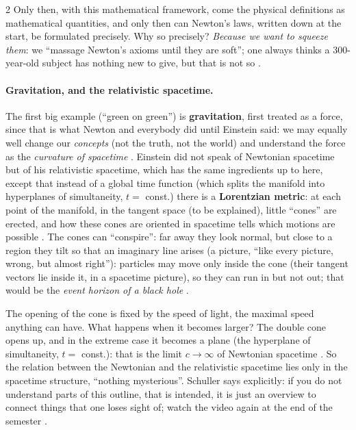 \begin{paracol}{2}
Only then, with this mathematical framework, come the physical definitions as mathematical quantities, and only then can
Newton's laws, written down at the start, be formulated precisely. Why so precisely? \emph{Because we want to squeeze
them}: we ``massage Newton's axioms until they are soft''; one always thinks a 300-year-old subject has nothing new to
give, but that is not so .

\paragraph{Gravitation, and the relativistic spacetime.} The first big example (``green on green'') is
\textbf{gravitation}, first treated as a force, since that is what Newton and everybody did until Einstein said: we may
equally well change our \emph{concepts} (not the truth, not the world) and understand the force as the
\emph{curvature of spacetime} . Einstein did not speak of Newtonian
spacetime but of his relativistic spacetime, which has the same ingredients up to here, except that instead of a global
time function (which splits the manifold into hyperplanes of simultaneity, $t=$ const.) there is a \textbf{Lorentzian
metric}: at each point of the manifold, in the tangent space (to be explained), little ``cones'' are erected, and how
these cones are oriented in spacetime tells which motions are possible .
The cones can ``conspire'': far away they look normal, but close to a region they tilt so that an imaginary line arises
(a picture, ``like every picture, wrong, but almost right''): particles may move only inside the cone (their tangent
vectors lie inside it, in a spacetime picture), so they can run in but not out; that would be the \emph{event horizon of
a black hole} .

The opening of the cone is fixed by the speed of light, the maximal speed anything can have. What happens when
it becomes larger? The double cone opens up, and in the extreme case it becomes a plane (the hyperplane of simultaneity,
$t=$ const.): that is the limit $c\to\infty$ of Newtonian spacetime .
So the relation between the Newtonian and the relativistic spacetime lies only in the spacetime structure, ``nothing
mysterious''. Schuller says explicitly: if you do not understand parts of this outline, that is intended, it is just an
overview to connect things that one loses sight of; watch the video again at the end of the semester
.


\end{paracol}
